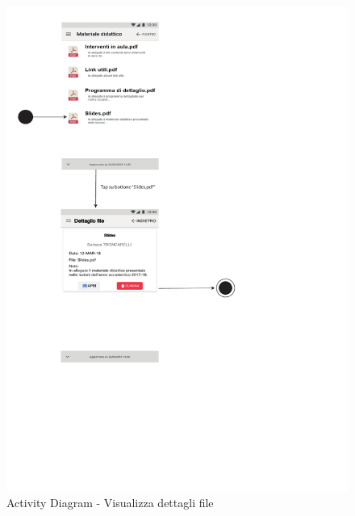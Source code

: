 \begin{figure}
	\centering
	\includegraphics[width=6in]{imgs/gruppo1/activity_diagrams/AD15_dettagli_file.pdf}
	\caption{Activity Diagram - Visualizza dettagli file}
	\label{diag:visualizzaDettagliFileAD}
\end{figure}
\newpage

